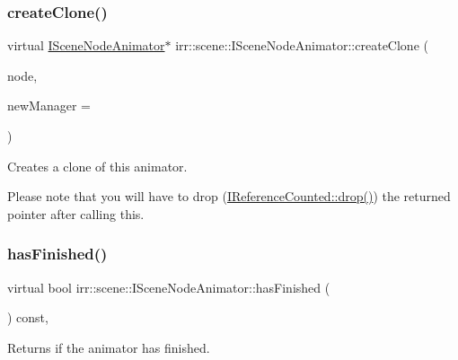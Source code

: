 \subsubsection{\texorpdfstring{create\+Clone()}{createClone()}\hspace{0.1cm}{\footnotesize\ttfamily [2/2]}}
{\footnotesize\ttfamily virtual \hyperlink{classirr_1_1scene_1_1ISceneNodeAnimator}{I\+Scene\+Node\+Animator}$\ast$ irr\+::scene\+::\+I\+Scene\+Node\+Animator\+::create\+Clone (\begin{DoxyParamCaption}\item[{\hyperlink{classirr_1_1scene_1_1ISceneNode}{I\+Scene\+Node} $\ast$}]{node,  }\item[{\hyperlink{classirr_1_1scene_1_1ISceneManager}{I\+Scene\+Manager} $\ast$}]{new\+Manager = {} }\end{DoxyParamCaption})\hspace{0.3cm}{\ttfamily [pure virtual]}}



Creates a clone of this animator. 

Please note that you will have to drop (\hyperlink{classirr_1_1IReferenceCounted_a03856a09355b89d178090c4a5f738543}{I\+Reference\+Counted\+::drop()}) the returned pointer after calling this. \mbox{\label{classirr_1_1scene_1_1ISceneNodeAnimator_a77fd626155079b11327f0bd775e85425}} 
\subsubsection{\texorpdfstring{has\+Finished()}{hasFinished()}\hspace{0.1cm}{\footnotesize\ttfamily [1/2]}}
{\footnotesize\ttfamily virtual bool irr\+::scene\+::\+I\+Scene\+Node\+Animator\+::has\+Finished (\begin{DoxyParamCaption}\item[{void}]{ }\end{DoxyParamCaption}) const\hspace{0.3cm}{\ttfamily [inline]}, {\ttfamily [virtual]}}



Returns if the animator has finished. 

